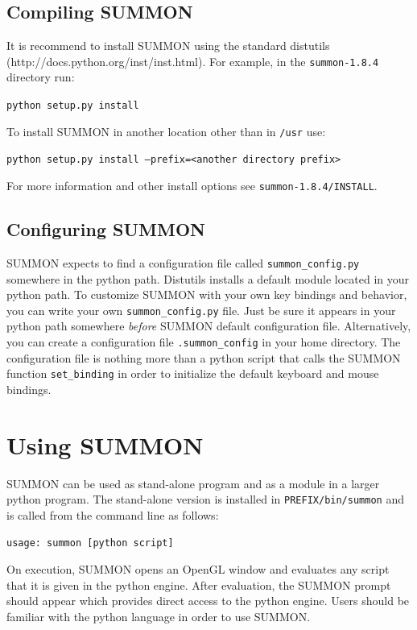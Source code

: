 \documentclass[12pt]{article}
\newcommand{\code}[1]{{\tt #1}}
\newcommand{\codeblock}[1]{\vspace{.1in} {\tt #1} \vspace{.1in}}
\newcommand{\version}{1.8.4}
\begin{document}
\subsection{Compiling SUMMON}

It is recommend to install SUMMON using the standard distutils 
(http://docs.python.org/inst/inst.html).  For example, in the
\code{summon-\version} directory run:

\codeblock{python setup.py install}

To install SUMMON in another location other than in \code{/usr} use:

\codeblock{python setup.py install --prefix=<another directory prefix>}

For more information and other install options see 
\code{summon-\version/INSTALL}.


\subsection{Configuring SUMMON}

SUMMON expects to find a configuration file called  \code{summon\_config.py}
somewhere in the python path.  Distutils installs a default module located in
your python path.  To customize SUMMON with your own key bindings and behavior,
you can write your own \code{summon\_config.py} file.  Just be sure it appears
in your python path somewhere {\em before} SUMMON default configuration file. 
Alternatively, you can create a configuration file \code{.summon\_config} in
your home directory.  The configuration file is nothing more than a python
script that calls the SUMMON function  \code{set\_binding} in order to
initialize the default keyboard and mouse  bindings.



\section{Using SUMMON}
\label{sec:using}

SUMMON can be used as stand-alone program and as a module in a larger python
program.  The stand-alone version is installed in \code{PREFIX/bin/summon} and
is called from the command line as follows:

\codeblock{usage: summon [python script]}

On execution, SUMMON opens an OpenGL window and evaluates any script that it is
given in the python engine. After evaluation, the SUMMON prompt should appear
which provides direct access to the python engine.  Users should be familiar
with the python language in order to use SUMMON.
\end{document}
